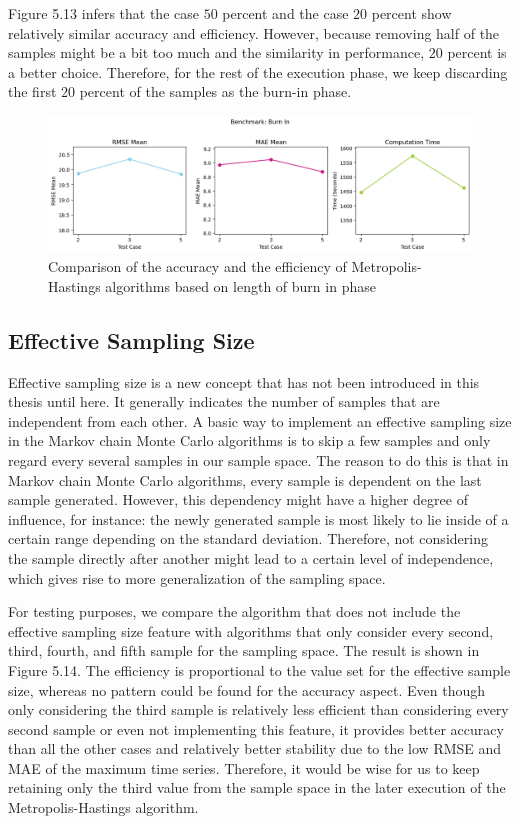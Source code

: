 Figure 5.13 infers that the case $50$ percent and the case $20$ percent show relatively similar accuracy and efficiency. However, because removing half of the samples might be a bit too much and the similarity in performance, $20$ percent is a better choice. Therefore, for the rest of the execution phase, we keep discarding the first $20$ percent of the samples as the burn-in phase.

\begin{figure}[H]
    \centering
    \includegraphics[width=1\textwidth]{figures/basic_mh/benchmark/burnin_factor.png}
    \captionsetup{width=.8\textwidth}
    \caption{Comparison of the accuracy and the efficiency of Metropolis-Hastings algorithms based on length of burn in phase}
    \label{fig:enter-label}
\end{figure}

\subsection{Effective Sampling Size}
Effective sampling size is a new concept that has not been introduced in this thesis until here. It generally indicates the number of samples that are independent from each other. A basic way to implement an effective sampling size in the Markov chain Monte Carlo algorithms is to skip a few samples and only regard every several samples in our sample space. The reason to do this is that in Markov chain Monte Carlo algorithms, every sample is dependent on the last sample generated. However, this dependency might have a higher degree of influence, for instance: the newly generated sample is most likely to lie inside of a certain range depending on the standard deviation. Therefore, not considering the sample directly after another might lead to a certain level of independence, which gives rise to more generalization of the sampling space. 

For testing purposes, we compare the algorithm that does not include the effective sampling size feature with algorithms that only consider every second, third, fourth, and fifth sample for the sampling space. The result is shown in Figure 5.14. The efficiency is proportional to the value set for the effective sample size, whereas no pattern could be found for the accuracy aspect. Even though only considering the third sample is relatively less efficient than considering every second sample or even not implementing this feature, it provides better accuracy than all the other cases and relatively better stability due to the low RMSE and MAE of the maximum time series. Therefore, it would be wise for us to keep retaining only the third value from the sample space in the later execution of the Metropolis-Hastings algorithm.


